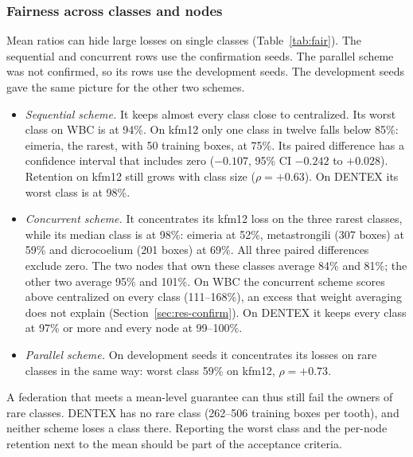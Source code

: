 \documentclass[pdflatex,sn-mathphys-num]{sn-jnl}
\begin{document}
\subsubsection{Fairness across classes and nodes}
Mean ratios can hide large losses on single classes (Table~\ref{tab:fair}). The sequential and concurrent rows use the confirmation seeds. The parallel scheme was not confirmed, so its rows use the development seeds. The development seeds gave the same picture for the other two schemes.
\begin{itemize}
\item \emph{Sequential scheme.} It keeps almost every class close to centralized. Its worst class on WBC is at 94\%. On kfm12 only one class in twelve falls below 85\%: eimeria, the rarest, with 50 training boxes, at 75\%. Its paired difference has a confidence interval that includes zero ($-0.107$, 95\% CI $-0.242$ to $+0.028$). Retention on kfm12 still grows with class size ($\rho=+0.63$). On DENTEX its worst class is at 98\%.
\item \emph{Concurrent scheme.} It concentrates its kfm12 loss on the three rarest classes, while its median class is at 98\%: eimeria at 52\%, metastrongili (307 boxes) at 59\% and dicrocoelium (201 boxes) at 69\%. All three paired differences exclude zero. The two nodes that own these classes average 84\% and 81\%; the other two average 95\% and 101\%. On WBC the concurrent scheme scores above centralized on every class (111--168\%), an excess that weight averaging does not explain (Section~\ref{sec:res-confirm}). On DENTEX it keeps every class at 97\% or more and every node at 99--100\%.
\item \emph{Parallel scheme.} On development seeds it concentrates its losses on rare classes in the same way: worst class 59\% on kfm12, $\rho=+0.73$.
\end{itemize}
A federation that meets a mean-level guarantee can thus still fail the owners of rare classes. DENTEX has no rare class (262--506 training boxes per tooth), and neither scheme loses a class there. Reporting the worst class and the per-node retention next to the mean should be part of the acceptance criteria.
\end{document}
